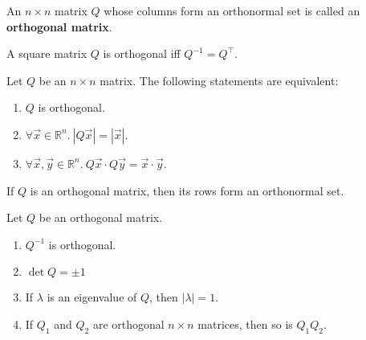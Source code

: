 \documentclass{article}
\begin{document}
\begin{definition}
    An $n \times n$ matrix $Q$ whose columns form an orthonormal set is called an \linebreak \textbf{orthogonal matrix}.
\end{definition}
\begin{theorem}
    A square matrix $Q$ is orthogonal iff $Q^{-1}=Q^\intercal $.
\end{theorem}
\begin{theorem}
    Let $Q$ be an $n\times n$ matrix. The following statements are equivalent:
    \begin{enumerate}
        \item $Q$ is orthogonal.
        \item $\forall \vec x \in \mathbb{R}^n.\:|Q\vec x| = |\vec x|$.
        \item $\forall \vec x, \vec y \in \mathbb{R}^n.\:Q\vec x\cdot Q\vec y = \vec x\cdot \vec y$.
    \end{enumerate}
\end{theorem}
\begin{theorem}
    If $Q$ is an orthogonal matrix, then its rows form an orthonormal set.
\end{theorem}
\begin{theorem}
    Let $Q$ be an orthogonal matrix.
    \begin{enumerate}
        \item $Q^{-1}$ is orthogonal.
        \item $\det Q = \pm 1$
        \item If $\lambda$ is an eigenvalue of $Q$, then $|\lambda|=1$.
        \item If $Q_1$ and $Q_2$ are orthogonal $n\times n$ matrices, then so is $Q_1Q_2$.
    \end{enumerate}
\end{theorem}
\end{document}
